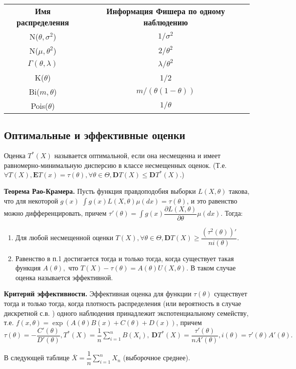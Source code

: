 \documentclass[a4paper,12pt]{scrartcl}
\newcommand{\E}{\mathbf{E}}
\newcommand{\D}{\mathbf{D}}
\begin{document}
\begin{tabular}{|c|c|}
{\bfseries Имя распределения} & \bfseries{Информация Фишера по одному наблюдению}\\
N($\theta,\sigma^2$)& $1/\sigma^2$ \\
N($\mu,\theta^2$)& $2/\theta^2$ \\
$\Gamma(\theta,\lambda)$& $\lambda/\theta^2  $\\
K($\theta$)& 1/2\\
Bi($m,\theta$)& $m/(\theta(1-\theta))$ \\
Pois($\theta$)& $1/\theta$\\
\end{tabular}
\subsection{Оптимальные и эффективные оценки}
Оценка $T^*(X)$ называется оптимальной, если она несмещенна и имеет равномерно-минимальную дисперсию в классе несмещенных оценок. (Т.е. $\forall T(X), \E T(x) = \tau(\theta), \forall \theta \in \Theta, \D T(X) \leqslant \D T^*(X)$.)


{\bfseries Теорема Рао-Крамера.} Пусть функция правдоподобия выборки $L(X,\theta)$ такова, что для некоторой $g(x)$ $\int g(x)L(X,\theta)\mu(dx) = \tau(\theta)$, и это равенство можно дифференцировать, причем $\tau'(\theta) = \int g(x)\dfrac{\partial L(X,\theta)}{\partial\theta}\mu(dx)$. Тогда:
\begin{enumerate}
 \item Для любой несмещенной оценки $T(X),\forall \theta\in\Theta, \D T(X) \geqslant \dfrac{(\tau^2(\theta))'}{ni(\theta)}.$
 \item Равенство в п.1 достигается тогда и только тогда, когда существует такая функция $A(\theta),$ что $T(X) - \tau(\theta) = A(\theta)U(X,\theta)$. В таком случае оценка называется эффективной.
\end{enumerate}

{\bfseries Критерий эффективности.} Эффективная оценка для функции $\tau(\theta)$ существует тогда и только тогда, когда плотность распределения (или вероятность в случае дискретной с.в. ) одного наблюдения принадлежит экспотенциальному семейству, т.е. $f(x,\theta) = \exp(A(\theta)B(x) + C(\theta) + D(x))$, причем $\tau(\theta) = - \dfrac{C'(\theta)}{D'(\theta)}, T^*(X) = \dfrac{1}{n}\sum\limits_{i=1}^{n}B(X_i),\ \D T^*(X) = \dfrac{\tau'(\theta)}{nA'(\theta)}, i(\theta) = \tau'(\theta)A'(\theta).$

В следующей таблице $\overline{X} = \dfrac{1}{n}\sum\limits_{i=1}^{n}X_n$ (выборочное среднее).
\end{document}
